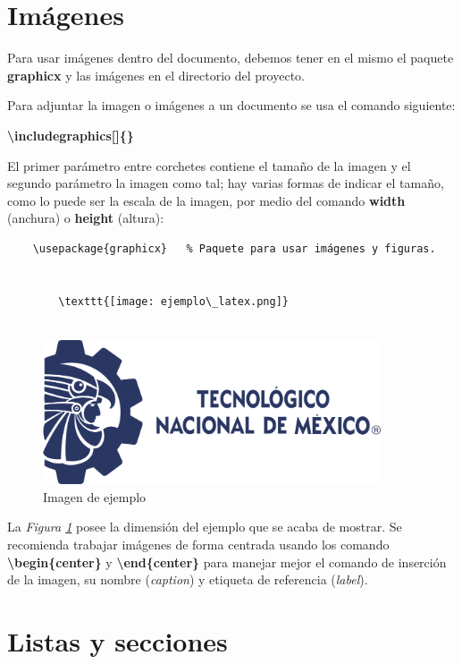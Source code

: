\section{Imágenes}

Para usar imágenes dentro del documento, debemos tener en el mismo el paquete \textbf{graphicx} y las imágenes en el directorio del proyecto.

Para adjuntar la imagen o imágenes a un documento se usa el comando siguiente:

\textbf{\textbackslash{includegraphics[]\{\}}}

El primer parámetro entre corchetes contiene el tamaño de la imagen y el segundo parámetro la imagen como tal; hay varias formas de indicar el tamaño, como lo puede ser la escala de la imagen, por medio del comando \textbf{width} (anchura) o \textbf{height} (altura):
\begin{lstlisting}
    \usepackage{graphicx}	% Paquete para usar imágenes y figuras.
    
    
        \texttt{[image: ejemplo\_latex.png]}
    
\end{lstlisting}
\begin{figure}[H]
    \begin{center}
    \caption{Imagen de ejemplo}
    \label{fig: 1}
    \includegraphics[width=10cm]{recursos/logo tecnm.png}
\end{center}
\end{figure}

La \textit{Figura \ref{fig: 1}} posee la dimensión del ejemplo que se acaba de mostrar. Se recomienda trabajar imágenes de forma centrada usando los comando \textbf{\textbackslash{begin\{center\}}} y \textbf{\textbackslash{end\{center\}}} para manejar mejor el comando de inserción de la imagen, su nombre (\textit{caption}) y etiqueta de referencia (\textit{label}).



\section{Listas y secciones}


